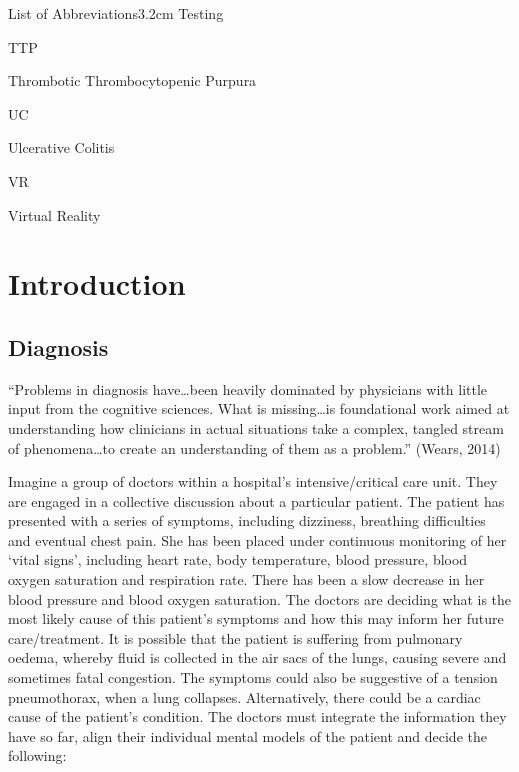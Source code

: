 \documentclass[a4paper, nobind]{templates/ociamthesis}
\begin{document}
\begin{romanpages}
\begin{mclistof}{List of Abbreviations}{3.2cm}
Testing

\item[TTP]

Thrombotic Thrombocytopenic Purpura

\item[UC]

Ulcerative Colitis

\item[VR]

Virtual Reality

\end{mclistof} 


\end{romanpages}

\flushbottom

\chapter*{Introduction}\label{introduction}

\adjustmtc
{}

\section*{Diagnosis}\label{diagnosis}

``Problems in diagnosis have\ldots been heavily dominated by physicians with little input from the cognitive sciences. What is missing\ldots is foundational work aimed at understanding how clinicians in actual situations take a complex, tangled stream of phenomena\ldots to create an understanding of them as a problem.'' (Wears, 2014)

Imagine a group of doctors within a hospital's intensive/critical care unit. They are engaged in a collective discussion about a particular patient. The patient has presented with a series of symptoms, including dizziness, breathing difficulties and eventual chest pain. She has been placed under continuous monitoring of her `vital signs', including heart rate, body temperature, blood pressure, blood oxygen saturation and respiration rate. There has been a slow decrease in her blood pressure and blood oxygen saturation. The doctors are deciding what is the most likely cause of this patient's symptoms and how this may inform her future care/treatment. It is possible that the patient is suffering from pulmonary oedema, whereby fluid is collected in the air sacs of the lungs, causing severe and sometimes fatal congestion. The symptoms could also be suggestive of a tension pneumothorax, when a lung collapses. Alternatively, there could be a cardiac cause of the patient's condition. The doctors must integrate the information they have so far, align their individual mental models of the patient and decide the following:
\end{document}
